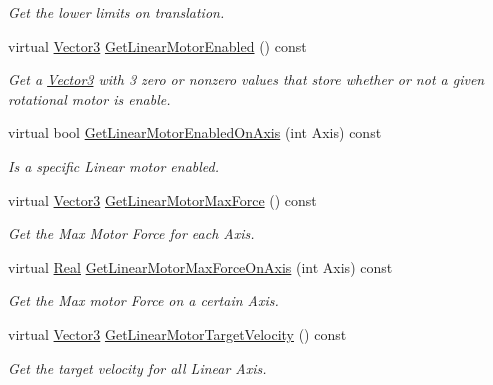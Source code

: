 \begin{DoxyCompactItemize}
\begin{DoxyCompactList}\small\item\em Get the lower limits on translation. \item\end{DoxyCompactList}\item 
virtual \hyperlink{classphys_1_1Vector3}{Vector3} \hyperlink{classphys_1_1Generic6DofConstraint_a2128b91e7e2d0b31082e43c7a9c44a38}{GetLinearMotorEnabled} () const 
\begin{DoxyCompactList}\small\item\em Get a \hyperlink{classphys_1_1Vector3}{Vector3} with 3 zero or nonzero values that store whether or not a given rotational motor is enable. \item\end{DoxyCompactList}\item 
virtual bool \hyperlink{classphys_1_1Generic6DofConstraint_a75adfc7d26cfbcd0678b68fbfa37ab60}{GetLinearMotorEnabledOnAxis} (int Axis) const 
\begin{DoxyCompactList}\small\item\em Is a specific Linear motor enabled. \item\end{DoxyCompactList}\item 
virtual \hyperlink{classphys_1_1Vector3}{Vector3} \hyperlink{classphys_1_1Generic6DofConstraint_a321f6fcf094ee27d253d866ea9de3e66}{GetLinearMotorMaxForce} () const 
\begin{DoxyCompactList}\small\item\em Get the Max Motor Force for each Axis. \item\end{DoxyCompactList}\item 
virtual \hyperlink{namespacephys_af7eb897198d265b8e868f45240230d5f}{Real} \hyperlink{classphys_1_1Generic6DofConstraint_a91144ce4ee14062acdb627baf5f06e28}{GetLinearMotorMaxForceOnAxis} (int Axis) const 
\begin{DoxyCompactList}\small\item\em Get the Max motor Force on a certain Axis. \item\end{DoxyCompactList}\item 
virtual \hyperlink{classphys_1_1Vector3}{Vector3} \hyperlink{classphys_1_1Generic6DofConstraint_a0eff3fbbd21d3658b5353f419ed5d3ac}{GetLinearMotorTargetVelocity} () const 
\begin{DoxyCompactList}\small\item\em Get the target velocity for all Linear Axis. \item\end{DoxyCompactList}\item 

\end{DoxyCompactItemize}

